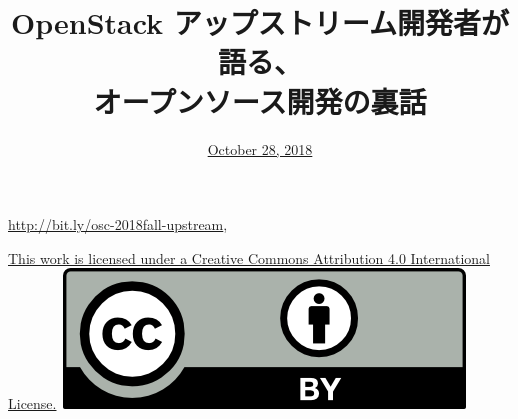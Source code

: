 \documentclass[aspectratio=169,11pt,hyperref={colorlinks=true}]{beamer}
\author[Masayuki Igawa]{%
    \texorpdfstring{%
        \begin{columns}
        \column{.7\linewidth}
            \centering
            Masayuki Igawa: \href{mailto:masayuki@igawa.io}{masayuki@igawa.io}\\
            \texttt{masayukig on
              \href{https://freenode.net/}{Freenode},
              \href{https://github.com/masayukig}{GitHub},
              \href{https://twitter.com/masayukig}{Twitter},
              \href{https://www.linkedin.com/in/masayukig/}{LinkedIn}}
        \end{columns}
        }
    {Masayuki Igawa}
}
\date{\href{https://events.opensuse.org/conference/summitasia18/program/proposal/2101}{October 28, 2018}}
\title[oss-development-inside-story
  \hspace{4em}\insertframenumber/\inserttotalframenumber]{OpenStack アップストリーム開発者が語る、\\
   オープンソース開発の裏話}
\begin{document}
{%
\begin{frame}[noframenumbering]
  \hypersetup{colorlinks,urlcolor=susedark}
  \titlepage{}
  \centering
  \@place \par
  \href{http://bit.ly/osc-2018fall-oss}{http://bit.ly/osc-2018fall-upstream},
  \vspace{1em}
  \begin{flushright}
    \tiny\href{https://creativecommons.org/licenses/by/4.0/}{This work
      is licensed under a Creative Commons Attribution 4.0
      International License.}~\includegraphics[scale=0.3]{images/cc_by.png}
  \end{flushright}
\end{frame}
}
\end{document}

